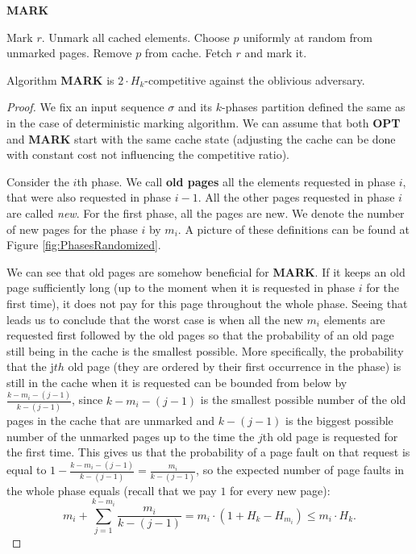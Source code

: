 \begin{algorithm}
\caption{\textbf{MARK}}
\label{alg:MARK}
\begin{algorithmic}[1]
    \State Mark $r$.
  \Else
	\State Unmark all cached elements.
      \EndIf
      \State Choose $p$ uniformly at random from unmarked pages.
      \State Remove $p$ from cache.
    \EndIf
    \State Fetch $r$ and mark it.
  \EndIf
\EndFor
\end{algorithmic}
\end{algorithm}
\begin{theorem}
\cite{markcom} Algorithm \textbf{MARK} is $2 \cdot H_k$-competitive against the oblivious 
adversary.
\end{theorem}
\begin{proof}
We fix an input sequence $\sigma$ and its $k$-phases partition defined the same as 
in the case of deterministic marking algorithm. We can assume that both 
\textbf{OPT} and \textbf{MARK} start with the same cache state (adjusting the 
cache can be done with constant cost not influencing the competitive ratio).

Consider the $i$th phase. We call \textbf{old pages} all the elements requested 
in 
phase $i$, that were also requested in phase $i-1$. All the other pages requested 
in phase $i$ are called \textit{new}. For the first phase, all the pages are new. We 
denote the number of new pages for the phase $i$ by $m_i$. A picture of these 
definitions can be found at Figure \ref{fig:PhasesRandomized}.


We can see that old pages are somehow beneficial for \textbf{MARK}. If it keeps 
an old page sufficiently long (up to the moment when it is requested 
in phase $i$ for the first time), it does not pay for this page throughout the whole phase. Seeing that 
leads us to conclude that the worst case is when all the new 
$m_i$ elements are requested first followed by the old pages so that the probability of an old 
page still being in the cache is the smallest possible. More specifically, the 
probability that the j$th$ old page (they are ordered by their first 
occurrence in the phase) is still in the cache when it is requested can be bounded from below by 
$\frac{k-m_i-(j-1)}{k-(j-1)}$, since $k-m_i-(j-1)$ is the smallest possible number of the old pages in 
the cache that are unmarked and $k-(j-1)$ is the biggest possible number of the unmarked pages 
up to the time the $j$th old page is requested for the first time. This gives us that 
the probability of a page fault on that request is equal to $1 - 
\frac{k-m_i-(j-1)}{k-(j-1)} = \frac{m_i}{k-(j-1)}$, so the expected number of 
page faults in the whole phase equals (recall that we pay $1$ for every new page):
$$ m_i + \sum_{j=1}^{k - m_i}\frac{m_i}{k-(j-1)} = m_i\cdot(1+H_k-H_{m_i}) \leq 
m_i \cdot H_k.$$


\end{proof}
